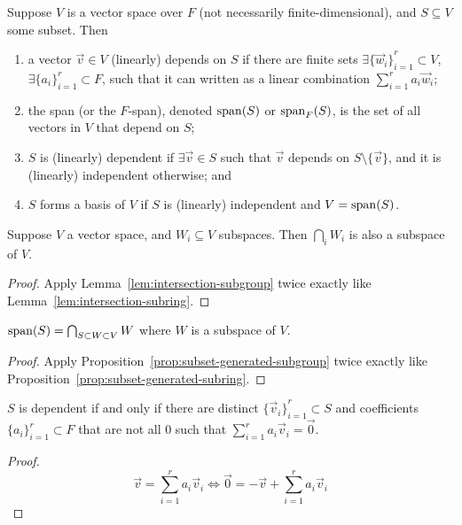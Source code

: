 \begin{definition}
    Suppose \(V\) is a vector space over \(F\)
    (not necessarily finite-dimensional),
    and \(S \subseteq V\) some subset.
    Then
    \begin{enumerate}[label={(\roman*)}, itemsep=0mm]
        \item a vector \(\vec{v} \in V\) (linearly) depends on \(S\)
            if there are finite sets \(\exists {\{\vec{w}_i\}}_{i=1}^r \subset V\),
            \(\exists {\{a_i\}}_{i=1}^r \subset F\),
            such that it can written as a linear combination
            \(\sum_{i=1}^r a_i \vec{w}_i\);
        \item the span (or the \(F\)-span), denoted \(\operatorname{span}(S)\) or \(\operatorname{span}_F(S)\),
            is the set of all vectors in \(V\) that depend on \(S\);
        \item \(S\) is (linearly) dependent if \(\exists \vec{v} \in S\)
            such that \(\vec{v}\) depends on \(S \setminus \{\vec{v}\}\),
            and it is (linearly) independent otherwise; and
        \item \(S\) forms a basis of \(V\)
            if \(S\) is (linearly) independent and \(V = \operatorname{span}(S)\).
    \end{enumerate}
\end{definition}
\begin{lemma}\label{lem:intersection-subspace}
    Suppose \(V\) a vector space, and \(W_i \subseteq V\) subspaces.
    Then \(\bigcap_i W_i\) is also a subspace of \(V\).
\end{lemma}
\begin{proof}
    Apply Lemma~\ref{lem:intersection-subgroup} twice
    exactly like Lemma~\ref{lem:intersection-subring}.
\end{proof}
\begin{proposition}\label{prop:subset-generated-subspace}
    \(\operatorname{span}(S) = \bigcap_{S \subset W \subset V} W\)
    where \(W\) is a subspace of \(V\).
\end{proposition}
\begin{proof}
    Apply Proposition~\ref{prop:subset-generated-subgroup} twice
    exactly like Proposition~\ref{prop:subset-generated-subring}.
\end{proof}

\begin{lemma}
    \(S\) is dependent if and only if 
    there are distinct \({\{\vec{v}_i\}}_{i=1}^r \subset S\)
    and coefficients \({\{a_i\}}_{i=1}^r \subset F\) that are not all 0
    such that \(\sum_{i=1}^r a_i \vec{v}_i = \vec{0}\).
\end{lemma}
\begin{proof}
    \begin{equation*}
        \vec{v} = \sum_{i=1}^r a_i \vec{v}_i
        \iff \vec{0} = -\vec{v} + \sum_{i=1}^r a_i \vec{v}_i
    \end{equation*}
\end{proof}

